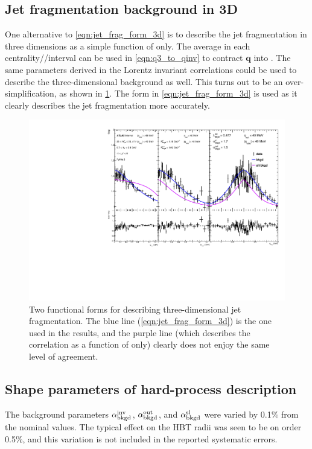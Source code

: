 \subsection{Jet fragmentation background in 3D}

One alternative to \cref{eqn:jet_frag_form_3d} is to describe the jet fragmentation in three dimensions as a simple function of \qinv only.
The average \kt in each centrality/\kt/\kys interval can be used in \cref{eqn:q3_to_qinv} to contract $\mathbf{q}$ into \qinv.
The same parameters derived in the Lorentz invariant correlations could be used to describe the three-dimensional background as well.
This turns out to be an over-simplification, as shown in \cref{fig:pythia_qosl_alt_bkgd}.
The form in \cref{eqn:jet_frag_form_3d} is used as it clearly describes the jet fragmentation more accurately.

\begin{figure}[t]
\begin{minipage}[t]{\textwidth}
\centering
\includegraphics[width=\linewidth]{can_Cqosl_pythia_altbkgd_cent7_e3_kt6_ys1.pdf}
\end{minipage}
\caption{Two functional forms for describing three-dimensional jet fragmentation. The blue line (\cref{eqn:jet_frag_form_3d}) is the one used in the results, and the purple line (which describes the correlation as a function of \qinv only) clearly does not enjoy the same level of agreement.}
\label{fig:pythia_qosl_alt_bkgd}
\end{figure}


\subsection{Shape parameters of hard-process description}
The background parameters $\alpha_{\mathrm{bkgd}}^\mathrm{inv}$, $\alpha_{\mathrm{bkgd}}^\mathrm{out}$, and $\alpha_{\mathrm{bkgd}}^\mathrm{sl}$ were varied by 0.1\% from the nominal values.
The typical effect on the HBT radii was seen to be on order 0.5\%, and this variation is not included in the reported systematic errors.

